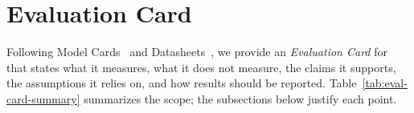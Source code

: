 
\section{Evaluation Card}
\label{sec:appendix-k}

Following Model Cards~\cite{ModelCards2019} and Datasheets~\cite{Datasheets2021},
we provide an \emph{Evaluation Card} for \parbench{} that states what it
measures, what it does not measure, the claims it supports, the assumptions it
relies on, and how results should be reported.
Table~\ref{tab:eval-card-summary} summarizes the scope; the subsections below
justify each point.

